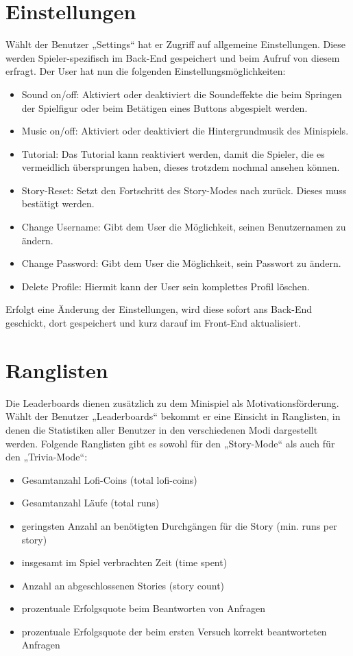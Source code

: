 \section{Einstellungen}
Wählt der Benutzer „Settings“ hat er Zugriff auf allgemeine Einstellungen. Diese werden Spieler-spezifisch im Back-End gespeichert und beim Aufruf 
von diesem erfragt. Der User hat nun die folgenden Einstellungsmöglichkeiten:
\begin{itemize}	
	\item Sound on/off: Aktiviert oder deaktiviert die Soundeffekte die beim Springen der Spielfigur oder beim Bet\"atigen eines Buttons abgespielt werden.
	\item Music on/off: Aktiviert oder deaktiviert die Hintergrundmusik des Minispiels.
	\item Tutorial: Das Tutorial kann reaktiviert werden, damit die Spieler, die es vermeidlich \"ubersprungen haben, dieses trotzdem nochmal ansehen k\"onnen. 
	\item Story-Reset: Setzt den Fortschritt des Story-Modes nach zurück. Dieses muss best\"atigt werden.
	\item Change Username: Gibt dem User die Möglichkeit, seinen Benutzernamen zu ändern.
	\item Change Password: Gibt dem User die Möglichkeit, sein Passwort zu ändern.
	\item Delete Profile: Hiermit kann der User sein komplettes Profil l\"oschen.
\end{itemize}	
Erfolgt eine Änderung der Einstellungen, wird diese sofort ans Back-End geschickt, dort gespeichert und kurz darauf im Front-End aktualisiert.
	
	
\section{Ranglisten}
Die Leaderboards dienen zus\"atzlich zu dem Minispiel als Motivationsf\"orderung.
Wählt der Benutzer „Leaderboards“ bekommt er eine Einsicht in Ranglisten, in denen die Statistiken aller Benutzer in den verschiedenen Modi dargestellt werden.
Folgende Ranglisten gibt es sowohl für den „Story-Mode“ als auch für den „Trivia-Mode“:
\begin{itemize}	
	\item Gesamtanzahl Lofi-Coins (total lofi-coins)
	\item Gesamtanzahl Läufe (total runs)
	\item geringsten Anzahl an benötigten Durchgängen für die Story (min. runs per story)
	\item insgesamt im Spiel verbrachten Zeit (time spent)
	\item Anzahl an abgeschlossenen Stories (story count)
	\item prozentuale Erfolgsquote beim Beantworten von Anfragen
	\item prozentuale Erfolgsquote der beim ersten Versuch korrekt beantworteten Anfragen
\end{itemize}
	
